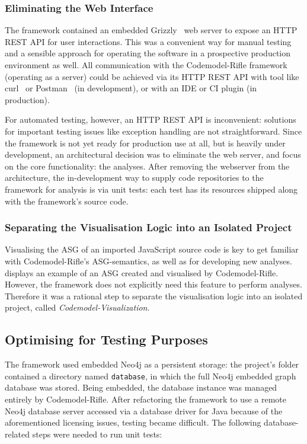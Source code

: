 \subsubsection{Eliminating the Web Interface}

The framework contained an embedded Grizzly~\cite{grizzly-website} web server to expose an HTTP REST API for user interactions. This was a convenient way for manual testing and a sensible approach for operating the software in a prospective production environment as well. All communication with the Codemodel-Rifle framework (operating as a server) could be achieved via its HTTP REST API with tool like curl~\cite{curl-website} or Postman~\cite{postman-website} (in development), or with an IDE or CI plugin (in production).

For automated testing, however, an HTTP REST API is inconvenient: solutions for important testing issues like exception handling are not straightforward. Since the framework is not yet ready for production use at all, but is heavily under development, an architectural decision was to eliminate the web server, and focus on the core functionality: the analyses. After removing the webserver from the architecture, the in-development way to supply code repositories to the framework for analysis is via unit tests: each test has its resources shipped along with the framework's source code.


\subsubsection{Separating the Visualisation Logic into an Isolated Project}

Visualising the ASG of an imported JavaScript source code is key to get familiar with Codemodel-Rifle's ASG-semantics, as well as for developing new analyses.  displays an example of an ASG created and visualised by Codemodel-Rifle. However, the framework does not explicitly need this feature to perform analyses. Therefore it was a rational step to separate the visualisation logic into an isolated project, called \emph{Codemodel-Visualization}.


\subsection{Optimising for Testing Purposes}

The framework used embedded Neo4j as a persistent storage: the project's folder contained a directory named \lstinline{database}, in which the full Neo4j embedded graph database was stored. Being embedded, the database instance was managed entirely by Codemodel-Rifle. After refactoring the framework to use a remote Neo4j database server accessed via a database driver for Java because of the aforementioned licensing issues, testing became difficult. The following database-related steps were needed to run unit tests:

